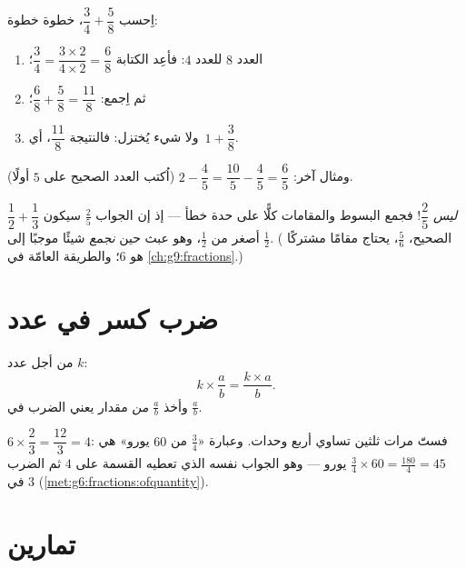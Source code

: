 \begin{example}\label{ex:g7:fractions:add}
اِحسب $\dfrac{3}{4} + \dfrac{5}{8}$، خطوة خطوة:
\begin{enumerate}
  \item العدد $8$  للعدد $4$: فأعِد الكتابة
        $\dfrac34 = \dfrac{3 \times 2}{4 \times 2} = \dfrac{6}{8}$؛
  \item ثم اِجمع: $\dfrac{6}{8} + \dfrac{5}{8} = \dfrac{11}{8}$؛
  \item ولا شيء يُختزل: فالنتيجة $\dfrac{11}{8}$، أي\
        $1 + \dfrac38$.
\end{enumerate}
ومثال آخر: $2 - \dfrac{4}{5} = \dfrac{10}{5} - \dfrac{4}{5} =
\dfrac{6}{5}$ (اُكتب العدد الصحيح على  $5$
أولًا).
\end{example}

\begin{example}[فخّ كلاسيكي]\label{ex:g7:fractions:trap}
$\dfrac12 + \dfrac13$ \emph{ليس} $\dfrac{2}{5}$! فجمع البسوط
والمقامات كلًّا على حدة خطأ --- إذ إن الجواب $\frac25$ سيكون
أصغر من $\frac12$، وهو عبث حين \emph{نجمع} شيئًا موجبًا
إلى $\frac12$. ( الصحيح، $\frac56$، يحتاج مقامًا مشتركًا
هو $6$؛ والطريقة العامّة في \cref{ch:g9:fractions}.)
\end{example}

\section{ضرب كسر في عدد}

\begin{proposition}\label{prop:g7:fractions:mult}
من أجل عدد $k$:
\[
k \times \frac{a}{b} = \frac{k \times a}{b} .
\]
وأخذ $\frac ab$ \emph{من} مقدار يعني الضرب في
$\frac ab$.
\end{proposition}
\admitted

\begin{example}\label{ex:g7:fractions:mult}
$6 \times \dfrac{2}{3} = \dfrac{12}{3} = 4$: فستّ مرات ثلثين تساوي
أربع وحدات. وعبارة «$\frac34$ من $60$ يورو» هي
$\frac34 \times 60 = \frac{180}{4} = 45$ يورو --- وهو الجواب نفسه الذي تعطيه
القسمة على $4$ ثم الضرب في $3$
(\cref{met:g6:fractions:ofquantity}).
\end{example}

\section{تمارين}

